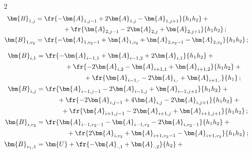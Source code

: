\begin{multicols}{2}
\begin{align*}
  \bm{B}_{1,j} &= \fr{-\bm{A}_{1,j-1} +2\bm{A}_{1,j} -\bm{A}_{1,j+1}}{h_1h_2}+{}\\


  &  \hspace*{15mm} {}+


\fr{\bm{A}_{2,j-1} -2\bm{A}_{2,j} +\bm{A}_{2,j+1}}{h_1h_2}\,;\\


   \bm{B}_{1,v_2}&= \fr{-\bm{A}_{1,v_2-1} +\bm{A}_{1,v_2} +\bm{A}_{2,v_2-1}- \bm{A}_{2,v_2}}{h_1h_2}\,;


  \end{align*}


  


\noindent


  \begin{align*}


   \bm{B}_{i,1}&= \fr{ -\bm{A}_{i-1,1} +\bm{A}_{i-1,2} +2\bm{A}_{i,1}}{h_1h_2}+{}\\


  &\hspace*{15mm}{}+   \fr{ -2\bm{A}_{i,2} -\bm{A}_{i+1,1} +\bm{A}_{i+1,2}}{h_1h_2}+{}\\


  &\hspace*{25mm}{}+ \fr{ \bm{A}_{i-1,\cdot } - 2\bm{A}_{i,\cdot} +\bm{A}_{i+1,\cdot}}{h_1}\,;\\


  \bm{B}_{i,j} &=\fr{\bm{A}_{i-1,j-1} -2\bm{A}_{i-1,j} +\bm{A}_{i-1,j+1}}{h_1h_2}+{}\\


  &\hspace*{11mm}{}+ \fr{-2\bm{A}_{i,j-1} +4\bm{A}_{i,j} -2\bm{A}_{i,j+1}}{h_1h_2} +{}\\


 &\hspace*{13mm}{}+  \fr{\bm{A}_{i+1,j-1} -2\bm{A}_{i+1,j}+\bm{A}_{i+1,j+1}}{h_1h_2}\,;\\


  \bm{B}_{i,v_2}&= \fr{\bm{A}_{i-1,v_2-1} -\bm{A}_{i-1,v_2} -2\bm{A}_{i,v_2-1}}{h_1h_2} +{}\\


 & \hspace*{16mm}{}+\fr{2\bm{A}_{i,v_2} +\bm{A}_{i+1,v_2-1} -\bm{A}_{i+1,v_2}}{h_1h_2}\,;\\


  \bm{B}_{v_1,1} &=\bm{U} +\fr{ -\bm{A}_{\cdot,1} +\bm{A}_{\cdot, 2}}{h_2}+ {}\\



\end{align*}
\end{multicols}
